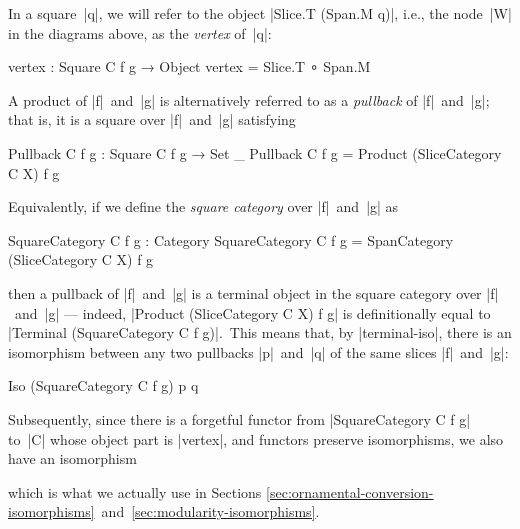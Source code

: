 In a square~|q|, we will refer to the object |Slice.T (Span.M q)|, i.e., the node~|W| in the diagrams above, as the \emph{vertex} of~|q|:
\begin{code}
vertex : Square C f g → Object
vertex = Slice.T ∘ Span.M
\end{code}
A product of |f|~and~|g| is alternatively referred to as a \emph{pullback} of |f|~and~|g|; that is, it is a square over |f|~and~|g| satisfying
\begin{code}
Pullback C f g : Square C f g → Set _
Pullback C f g = Product (SliceCategory C X) f g
\end{code}
Equivalently, if we define the \emph{square category} over |f|~and~|g| as
\begin{code}
SquareCategory C f g : Category
SquareCategory C f g = SpanCategory (SliceCategory C X) f g
\end{code}
then a pullback of |f|~and~|g| is a terminal object in the square category over |f|~and~|g| --- indeed, |Product (SliceCategory C X) f g| is definitionally equal to |Terminal (SquareCategory C f g)|.\
This means that, by |terminal-iso|, there is an isomorphism between any two pullbacks |p|~and~|q| of the same slices |f|~and~|g|:
\begin{code}
Iso (SquareCategory C f g) p q
\end{code}
Subsequently, since there is a forgetful functor from |SquareCategory C f g| to~|C| whose object part is |vertex|, and functors preserve isomorphisms, we also have an isomorphism
\begin{flalign}
&\hskip\mathindent |Iso C (vertex p) (vertex q)| &
\label{eq:vertex-iso}
\end{flalign}
which is what we actually use in Sections \ref{sec:ornamental-conversion-isomorphisms}~and~\ref{sec:modularity-isomorphisms}.


